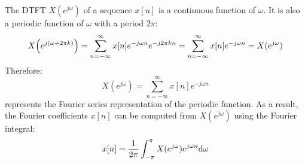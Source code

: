 \documentclass[../../main/main.tex]{subfiles}
\begin{document}
The DTFT \( X(e^{j\omega}) \) of a sequence \( x[n] \) is a continuous function of \( \omega \). It is also a periodic function of \( \omega \) with a period \( 2\pi \):
\begin{equation}
    X\qty(e^{j(\omega + 2\pi k)})
    =
    \sum_{n=-\infty}^{\infty} x[n] e^{-j\omega n} e^{-j 2\pi kn}
    =
    \sum_{n=-\infty}^{\infty} x[n] e^{-j\omega n}
    =
    X(e^{j\omega})
    \label{eq:L08_S25_1}
\end{equation}
Therefore:
\begin{equation}
    X(e^{j\omega})
    =
    \sum_{n=-\infty}^{\infty} x[n] e^{-j\omega n}
    \label{eq:L08_S26_1}
\end{equation}
represents the Fourier series representation of the periodic function. As a result, the Fourier coefficients \( x[n] \) can be computed from \( X(e^{j\omega}) \) using the Fourier integral:
\begin{equation}
    x[n]
    =
    \frac{1}{2\pi} \int_{-\pi}^{\pi} X(e^{j\omega}) e^{j\omega n} \mathrm{d}{\omega}
    \label{eq:L08_S26_2}
\end{equation}
\end{document}
